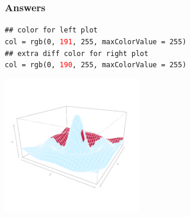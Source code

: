 \documentclass{beamer}
\begin{document}

\begin{frame}[fragile]
\frametitle{Answers}

\texttt{\textcolor{codegreen}{\#\# color for left plot}}\\
\texttt{col = rgb(0, \textcolor{red}{191}, 255, maxColorValue = 255)} \\

\texttt{\textcolor{codegreen}{\#\# extra diff color for right plot}}\\
\texttt{col = rgb(0, \textcolor{red}{190}, 255, maxColorValue = 255)} \\

\begin{center}
\includegraphics[height = 6cm, width = 6cm]{plot/persp_diff_3.pdf}
\end{center}

\end{frame}



\end{document}
